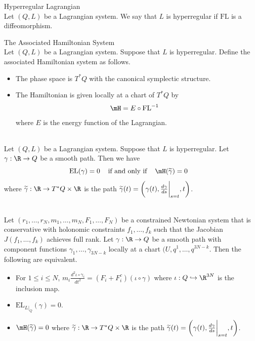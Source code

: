 \documentclass[a4paper]{article}
\begin{document}
\begin{defn}{Hyperregular Lagrangian}{}\\
Let $(Q,L)$ be a Lagrangian system. We say that $L$ is hyperregular if $\text{FL}$ is a diffeomorphism. 
\end{defn}

\begin{defn}{The Associated Hamiltonian System}{}\\
Let $(Q,L)$ be a Lagrangian system. Suppose that $L$ is hyperregular. Define the associated Hamiltonian system as follows. 
\begin{itemize}
\item The phase space is $T^\ast Q$ with the canonical symplectic structure. 
\item The Hamiltonian is given locally at a chart of $T^\ast Q$ by $$\mH=E\circ\text{FL}^{-1}$$ where $E$ is the energy function of the Lagrangian. 
\end{itemize}
\end{defn}

\begin{thm}{}{}\\
Let $(Q,L)$ be a Lagrangian system. Suppose that $L$ is hyperregular. Let $\gamma:\R\to Q$ be a smooth path. Then we have $$\text{EL}(\gamma)=0\;\;\;\text{ if and only  if }\;\;\;\mH(\widetilde{\gamma})=0$$ where $\widetilde{\gamma}:\R\to T^\ast Q\times\R$ is the path $\widetilde{\gamma}(t)=\left(\gamma(t),\frac{d\gamma}{ds}\bigg{|}_{s=t},t\right)$. 
\end{thm}

\begin{crl}{}{}\\
Let $(r_1,\dots,r_N,m_1,\dots,m_N,F_1,\dots,F_N)$ be a constrained Newtonian system that is conservative with holonomic constraints $f_1,\dots,f_k$ such that the Jacobian $J(f_1,\dots,f_k)$ achieves full rank. Let $\gamma:\R\to Q$ be a smooth path with component functions $\gamma_1,\dots,\gamma_{3N-k}$ locally at a chart $(U,q^1,\dots,q^{3N-k}$. Then the following are equivalent. 
\begin{itemize}
\item For $1\leq i\leq N$, $m_i\frac{d^2\iota\circ\gamma_i}{dt^2}=(F_i+F_i^c)(\iota\circ\gamma)$ where $\iota:Q\hookrightarrow\R^{3N}$ is the inclusion map. 
\item $\text{EL}_{L|_Q}(\gamma)=0$. 
\item $\mH(\widetilde{\gamma})=0$ where $\widetilde{\gamma}:\R\to T^\ast Q\times\R$ is the path $\widetilde{\gamma}(t)=\left(\gamma(t),\frac{d\gamma}{ds}\bigg{|}_{s=t},t\right)$. 
\end{itemize}
\end{crl}
\end{document}
